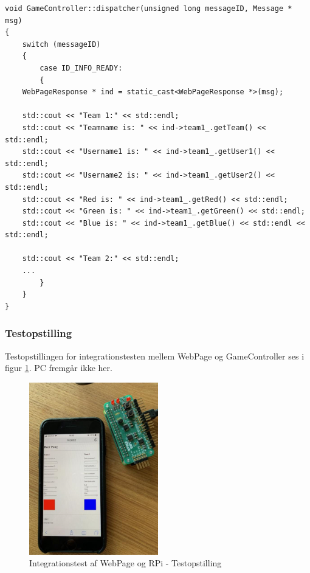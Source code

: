 \documentclass[Integrationstest/Integrationstest_main.tex]{subfiles}
\begin{document}
\begin{lstlisting}
void GameController::dispatcher(unsigned long messageID, Message * msg)
{
    switch (messageID) 
    {
        case ID_INFO_READY:
        {
	WebPageResponse * ind = static_cast<WebPageResponse *>(msg);

	std::cout << "Team 1:" << std::endl;
	std::cout << "Teamname is: " << ind->team1_.getTeam() << std::endl;
	std::cout << "Username1 is: " << ind->team1_.getUser1() << std::endl;
	std::cout << "Username2 is: " << ind->team1_.getUser2() << std::endl;
	std::cout << "Red is: " << ind->team1_.getRed() << std::endl;
	std::cout << "Green is: " << ind->team1_.getGreen() << std::endl;
	std::cout << "Blue is: " << ind->team1_.getBlue() << std::endl << std::endl;

	std::cout << "Team 2:" << std::endl;
	...
    	}
    }
}
\end{lstlisting}

\subsubsection{Testopstilling}
Testopstillingen for integrationstesten mellem WebPage og GameController ses i figur \ref{fig:webpage_integration_testopstilling}. PC fremgår ikke her.
\begin{figure}[H]
    \centering
    \includegraphics[width=0.5\textwidth]{Integrationstest/WebPageogRPi/graphics/integrationstest3_web_game.png}
    \caption{Integrationstest af WebPage og RPi - Testopstilling}
    \label{fig:webpage_integration_testopstilling}
\end{figure}
\end{document}

